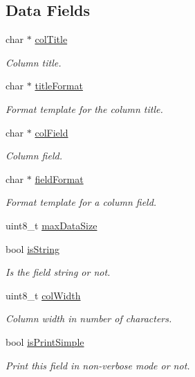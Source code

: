 \subsection*{Data Fields}
\begin{DoxyCompactItemize}
\item 
char $\ast$ \hyperlink{struct_column_info__t_a602a4e6bfc5f338334b093287d3a1057}{col\+Title}
\begin{DoxyCompactList}\small\item\em Column title. \end{DoxyCompactList}\item 
char $\ast$ \hyperlink{struct_column_info__t_a237f462c160dab71285059206384d2c1}{title\+Format}
\begin{DoxyCompactList}\small\item\em Format template for the column title. \end{DoxyCompactList}\item 
char $\ast$ \hyperlink{struct_column_info__t_a71386967e2d59e8ac3f29de5604b1e2a}{col\+Field}
\begin{DoxyCompactList}\small\item\em Column field. \end{DoxyCompactList}\item 
char $\ast$ \hyperlink{struct_column_info__t_a5d8a42d79af3a6f71d2d0b4b1ef948d2}{field\+Format}
\begin{DoxyCompactList}\small\item\em Format template for a column field. \end{DoxyCompactList}\item 
uint8\+\_\+t \hyperlink{struct_column_info__t_a92291da62cdc37358679c5176213d0f4}{max\+Data\+Size}
\item 
bool \hyperlink{struct_column_info__t_a6ce44156b2da6153d4b229e1a62e6df2}{is\+String}
\begin{DoxyCompactList}\small\item\em Is the field string or not. \end{DoxyCompactList}\item 
uint8\+\_\+t \hyperlink{struct_column_info__t_a8702e40adb6e49dc927c368121333508}{col\+Width}
\begin{DoxyCompactList}\small\item\em Column width in number of characters. \end{DoxyCompactList}\item 
bool \hyperlink{struct_column_info__t_ae66c8cdf7404644c2bb483fbc5218583}{is\+Print\+Simple}
\begin{DoxyCompactList}\small\item\em Print this field in non-\/verbose mode or not. \end{DoxyCompactList}\end{DoxyCompactItemize}



